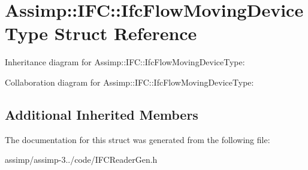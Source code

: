 \hypertarget{struct_assimp_1_1_i_f_c_1_1_ifc_flow_moving_device_type}{\section{Assimp\+:\+:I\+F\+C\+:\+:Ifc\+Flow\+Moving\+Device\+Type Struct Reference}
\label{struct_assimp_1_1_i_f_c_1_1_ifc_flow_moving_device_type}
}


Inheritance diagram for Assimp\+:\+:I\+F\+C\+:\+:Ifc\+Flow\+Moving\+Device\+Type\+:


Collaboration diagram for Assimp\+:\+:I\+F\+C\+:\+:Ifc\+Flow\+Moving\+Device\+Type\+:
\subsection*{Additional Inherited Members}


The documentation for this struct was generated from the following file\+:\begin{DoxyCompactItemize}
\item 
assimp/assimp-\/3../code/I\+F\+C\+Reader\+Gen.\+h\end{DoxyCompactItemize}
